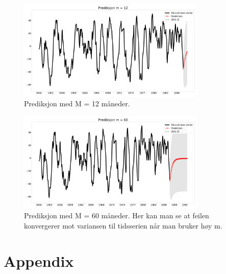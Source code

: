 \begin{figure}[hbt!]
    {\centering
        \includegraphics[width=0.80\textwidth]{task_33.pdf}
        \caption{Prediksjon med M = 12 måneder.}
        \label{task_3}
    \par}
    \end{figure}

    \begin{figure}[hbt!]
        {\centering
            \includegraphics[width=0.80\textwidth]{task_3.pdf}
            \caption{Prediksjon med M = 60 måneder. Her kan man se at feilen konvergerer mot variansen til tidsserien når man bruker høy m.}
            \label{task_33}
        \par}
        \end{figure}











\clearpage
\newpage

\section{Appendix}



